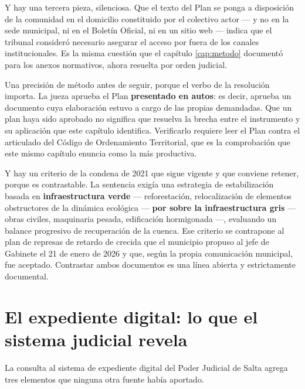 Y hay una tercera pieza, silenciosa. Que el texto del Plan se ponga a disposición de la comunidad en el domicilio constituido por el colectivo actor --- y no en la sede municipal, ni en el Boletín Oficial, ni en un sitio web --- indica que el tribunal consideró necesario asegurar el acceso por fuera de los canales institucionales. Es la misma cuestión que el capítulo \ref{cap:metodo} documentó para los anexos normativos, ahora resuelta por orden judicial.

\begin{cautela}
Una precisión de método antes de seguir, porque el verbo de la resolución importa. La jueza aprueba el Plan \textbf{presentado en autos}: es decir, aprueba un documento cuya elaboración estuvo a cargo de las propias demandadas. Que un plan haya sido aprobado no significa que resuelva la brecha entre el instrumento y su aplicación que este capítulo identifica. Verificarlo requiere leer el Plan contra el articulado del Código de Ordenamiento Territorial, que es la comprobación que este mismo capítulo enuncia como la más productiva.

Y hay un criterio de la condena de 2021 que sigue vigente y que conviene retener, porque es contrastable. La sentencia exigía una estrategia de estabilización basada en \textbf{infraestructura verde} --- reforestación, relocalización de elementos obstructores de la dinámica ecológica --- \textbf{por sobre la infraestructura gris} --- obras civiles, maquinaria pesada, edificación hormigonada ---, evaluando un balance progresivo de recuperación de la cuenca. Ese criterio se contrapone al plan de represas de retardo de crecida que el municipio propuso al jefe de Gabinete el 21 de enero de 2026 y que, según la propia comunicación municipal, fue aceptado. Contrastar ambos documentos es una línea abierta y estrictamente documental.
\end{cautela}

\section{El expediente digital: lo que el sistema judicial revela}

La consulta al sistema de expediente digital del Poder Judicial de Salta agrega tres elementos que ninguna otra fuente había aportado.

